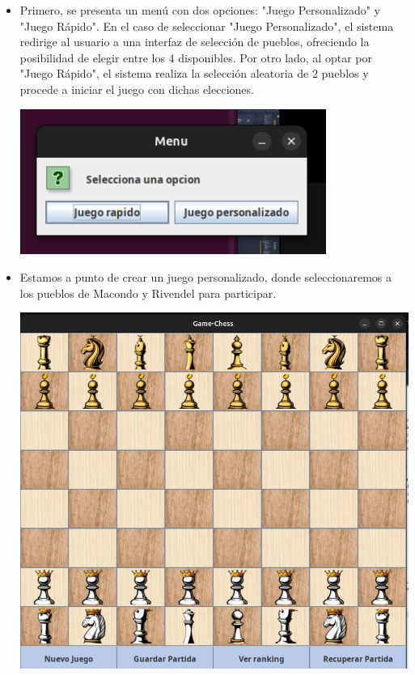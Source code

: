 \documentclass{article}
\begin{document}
             \begin{itemize}
                \item Primero, se presenta un menú con dos opciones: "Juego Personalizado" y "Juego Rápido". En el caso de seleccionar "Juego Personalizado", el sistema redirige al usuario a una interfaz de selección de pueblos, ofreciendo la posibilidad de elegir entre los 4 disponibles. Por otro lado, al optar por "Juego Rápido", el sistema realiza la selección aleatoria de 2 pueblos y procede a iniciar el juego con dichas elecciones.
         
\begin{center}
    \includegraphics[width=10cm]{latex/img/1.png}
\end{center}

            
\item Estamos a punto de crear un juego personalizado, donde seleccionaremos a los pueblos de Macondo y Rivendel para participar.
\begin{center}
    \includegraphics[width=16cm]{latex/img/2.png}
\end{center}


\end{itemize}
\end{document}
